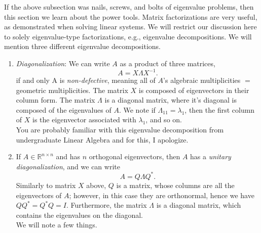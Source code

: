 \documentclass[paper=a4, fontsize=11pt]{scrartcl} %
\numberwithin{equation}{section} %
\numberwithin{figure}{section} %
\numberwithin{table}{section} %
\begin{document}
If the above subsection was nails, screws, and bolts of eigenvalue problems, then this section we learn about the power tools. Matrix factorizations are very useful, as demonstrated when solving linear systems. We will restrict our discussion here to solely eigenvalue-type factorizations, e.g., eigenvalue decompositions. We will mention three different eigenvalue decompositions. \\

\begin{enumerate}

\item \emph{Diagonalization}: We can write $A$ as a product of three matrices,  $$A=X\Lambda X^{-1}.$$ if and only A is \emph{non-defective}, meaning all of $A$'s algebraic multiplicities $=$ geometric multiplicities. The matrix $X$ is composed of eigenvectors in their column form. The matrix $\Lambda$ is a diagonal matrix, where it's diagonal is composed of the eigenvalues of $A$. We note if $\Lambda_{11}=\lambda_1$, then the first column of $X$ is the eigenvector associated with $\lambda_1$, and so on. \\

You are probably familiar with this eigenvalue decomposition from undergraduate Linear Algebra and for this, I apologize. 

\item If $A\in\mathbb{R}^{n\times n}$ and has $n$ orthogonal eigenvectors, then $A$ has a \emph{unitary diagonalization}, and we can write $$A = Q\Lambda Q^{*}.$$ Similarly to matrix $X$ above, $Q$ is a matrix, whose columns are all the eigenvectors of $A$; however, in this case they are orthonormal, hence we have $QQ^{*}=Q^{*}Q=I$. Furthermore, the matrix $\Lambda$ is a diagonal matrix, which contains the eigenvalues on the diagonal. \\

We will note a few things. 


\end{enumerate}
\end{document}
